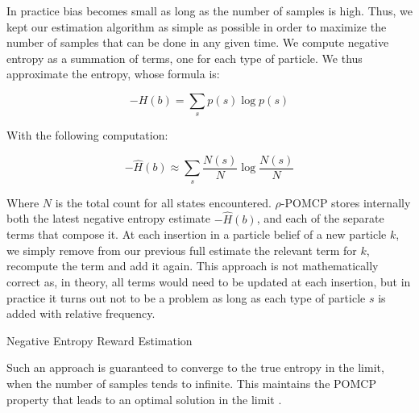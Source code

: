 In practice bias becomes small as long as the number of samples is high. Thus, we kept our
estimation algorithm as simple as possible in order to maximize the number of samples that can be
done in any given time. We compute negative entropy as a summation of terms, one for each type of
particle. We thus approximate the entropy, whose formula is:

\[ -H(b) = \sum_s p(s) \log p(s) \]

With the following computation:

\[ -\hat{H}(b) \approx \sum_s \frac{N(s)}{N} \log \frac{N(s)}{N} \]

Where $N$ is the total count for all states encountered. $\rho$-POMCP stores internally both the
latest negative entropy estimate $-\hat{H}(b)$, and each of the separate terms that compose it. At each
insertion in a particle belief of a new particle $k$, we simply remove from our previous full estimate the
relevant term for $k$, recompute the term and add it again. This approach is not mathematically
correct as, in theory, all terms would need to be updated at each insertion, but in practice it
turns out not to be a problem as long as each type of particle $s$ is added with relative frequency.

\begin{algorithm}[H]
    \caption{Negative Entropy Reward Estimation}


\end{algorithm}
%

Such an approach is guaranteed to converge to the true entropy in the limit, when the number of
samples tends to infinite. This maintains the POMCP property that leads to an optimal solution in
the limit \cite{cit:pomcp}.

